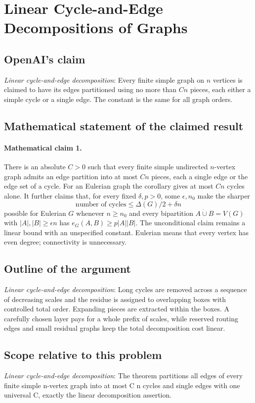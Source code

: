 \documentclass[11pt]{article}
\begin{document}
\section*{Linear Cycle-and-Edge Decompositions of Graphs}

\subsection{OpenAI's claim}
\textit{Linear cycle-and-edge decomposition}: Every finite simple graph on $n$ vertices is claimed to have its edges partitioned using no more than $Cn$ pieces, each either a simple cycle or a single edge. The constant is the same for all graph orders.

\subsection{Mathematical statement of the claimed result}
\paragraph{Mathematical claim 1.} There is an absolute $C>0$ such that every finite simple undirected $n$-vertex graph admits an edge partition into at most $Cn$ pieces, each a single edge or the edge set of a cycle. For an Eulerian graph the corollary gives at most $Cn$ cycles alone. It further claims that, for every fixed $\delta,p>0$, some $\epsilon,n_0$ make the sharper \[\text{number of cycles}\le\Delta(G)/2+\delta n\] possible for Eulerian $G$ whenever $n\ge n_0$ and every bipartition $A\mathbin{\dot\cup}B=V(G)$ with $|A|,|B|\ge\epsilon n$ has $e_G(A,B)\ge p|A||B|$. The unconditional claim remains a linear bound with an unspecified constant. Eulerian means that every vertex has even degree; connectivity is unnecessary.

\subsection{Outline of the argument}
\textit{Linear cycle-and-edge decomposition}: Long cycles are removed across a sequence of decreasing scales and the residue is assigned to overlapping boxes with controlled total order. Expanding pieces are extracted within the boxes. A carefully chosen layer pays for a whole prefix of scales, while reserved routing edges and small residual graphs keep the total decomposition cost linear.

\subsection{Scope relative to this problem}
\textit{Linear cycle-and-edge decomposition}: The theorem partitions all edges of every finite simple n-vertex graph into at most C n cycles and single edges with one universal C, exactly the linear decomposition assertion.
\end{document}
